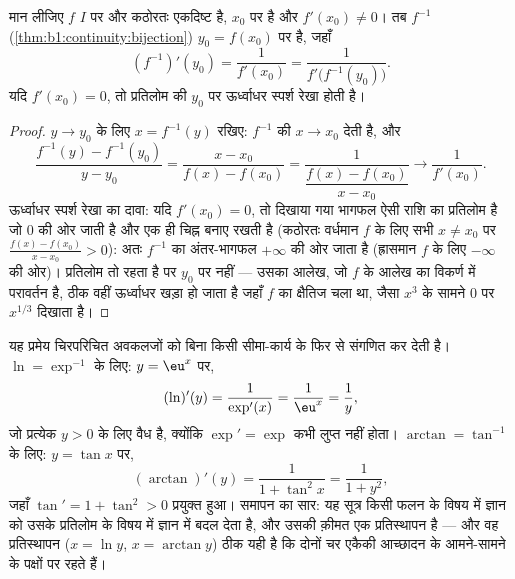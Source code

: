 \begin{theorem}\label{thm:b1:derivative:inverse}
मान लीजिए $f$ $I$ पर  और कठोरतः एकदिष्ट है, $x_0$ पर  है और
$f'(x_0) \neq 0$। तब $f^{-1}$ (\cref{thm:b1:continuity:bijection}) $y_0 =
f(x_0)$ पर  है, जहाँ
\[
(f^{-1})'(y_0) = \frac{1}{f'(x_0)} = \frac{1}{f'\bigl(f^{-1}(y_0)\bigr)} .
\]
यदि $f'(x_0) = 0$, तो प्रतिलोम की $y_0$ पर ऊर्ध्वाधर स्पर्श रेखा होती है।
\end{theorem}

\begin{proof}
$y \to y_0$ के लिए $x = f^{-1}(y)$ रखिए: $f^{-1}$ की  $x \to x_0$
देती है, और
\[
\frac{f^{-1}(y) - f^{-1}(y_0)}{y - y_0}
= \frac{x - x_0}{f(x) - f(x_0)}
= \frac{1}{\dfrac{f(x) - f(x_0)}{x - x_0}}
\longrightarrow \frac{1}{f'(x_0)} .
\]
ऊर्ध्वाधर स्पर्श रेखा का दावा: यदि $f'(x_0) = 0$, तो दिखाया गया भागफल ऐसी
राशि का प्रतिलोम है जो $0$ की ओर जाती है और एक ही चिह्न बनाए रखती है (कठोरतः
वर्धमान $f$ के लिए सभी $x \neq x_0$ पर $\frac{f(x) - f(x_0)}{x - x_0} > 0$):
अतः $f^{-1}$ का अंतर-भागफल $+\infty$ की ओर जाता है (ह्रासमान $f$ के लिए
$-\infty$ की ओर)। प्रतिलोम  तो रहता है पर $y_0$ पर  नहीं --- उसका
आलेख, जो $f$ के आलेख का विकर्ण में परावर्तन है, ठीक वहीं ऊर्ध्वाधर खड़ा हो
जाता है जहाँ $f$ का क्षैतिज चला था, जैसा $x^3$ के सामने $0$ पर $x^{1/3}$
दिखाता है।
\end{proof}

\begin{example}[प्रतिलोम अवकलज, दो बार]\label{ex:b1:derivative:inverseaction}
यह प्रमेय चिरपरिचित अवकलजों को बिना किसी सीमा-कार्य के फिर से संगणित कर देती
है। $\ln = \exp^{-1}$ के लिए: $y = \eu^x$ पर,
\[
(\ln)'(y) = \frac{1}{\exp'(x)} = \frac{1}{\eu^{x}} = \frac1y ,
\]
जो प्रत्येक $y > 0$ के लिए वैध है, क्योंकि $\exp' = \exp$ कभी लुप्त नहीं
होता। $\arctan = \tan^{-1}$ के लिए: $y = \tan x$ पर,
\[
(\arctan)'(y) = \frac{1}{1 + \tan^2 x} = \frac{1}{1 + y^2} ,
\]
जहाँ $\tan' = 1 + \tan^2 > 0$ प्रयुक्त हुआ। समापन का सार: यह सूत्र किसी फलन
के विषय में ज्ञान को उसके प्रतिलोम के विषय में ज्ञान में बदल देता है, और
उसकी क़ीमत एक प्रतिस्थापन है --- और वह प्रतिस्थापन ($x = \ln y$, $x =
\arctan y$) ठीक यही  है कि दोनों चर एकैकी आच्छादन के आमने-सामने के पक्षों
पर रहते हैं।
\end{example}

